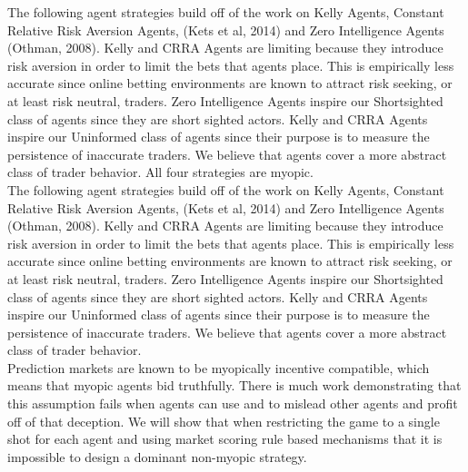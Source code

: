 The following agent strategies build off of the work on Kelly Agents, Constant Relative Risk Aversion Agents, (Kets et al, 2014) and Zero Intelligence Agents (Othman, 2008). Kelly and CRRA Agents are limiting because they introduce risk aversion in order to limit the bets that agents place. This is empirically less accurate since online betting environments are known to attract risk seeking, or at least risk neutral, traders. Zero Intelligence Agents inspire our Shortsighted class of agents since they are short sighted actors. Kelly and CRRA Agents inspire our Uninformed class of agents since their purpose is to measure the persistence of inaccurate traders. We believe that  agents cover a more abstract class of trader behavior. All four strategies are myopic.\\

The following agent strategies build off of the work on Kelly Agents, Constant Relative Risk Aversion Agents, (Kets et al, 2014) and Zero Intelligence Agents (Othman, 2008). Kelly and CRRA Agents are limiting because they introduce risk aversion in order to limit the bets that agents place. This is empirically less accurate since online betting environments are known to attract risk seeking, or at least risk neutral, traders. Zero Intelligence Agents inspire our Shortsighted class of agents since they are short sighted actors. Kelly and CRRA Agents inspire our Uninformed class of agents since their purpose is to measure the persistence of inaccurate traders. We believe that  agents cover a more abstract class of trader behavior.\\

Prediction markets are known to be myopically incentive compatible, which means that myopic agents bid truthfully. There is much work demonstrating that this assumption fails when agents can use  and  to mislead other agents and profit off of that deception. We will show that when restricting the game to a single shot for each agent and using market scoring rule based mechanisms that it is impossible to design a dominant non-myopic strategy.\\

